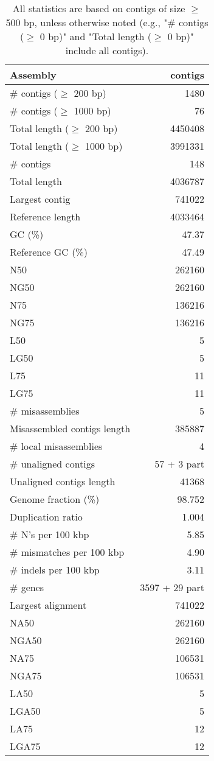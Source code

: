 \documentclass[12pt,a4paper]{article}
\begin{document}
\begin{table}[ht]
\begin{center}
\caption{All statistics are based on contigs of size $\geq$ 500 bp, unless otherwise noted (e.g., "\# contigs ($\geq$ 0 bp)" and "Total length ($\geq$ 0 bp)" include all contigs).}
\begin{tabular}{|l*{1}{|r}|}
\hline
Assembly & contigs \\ \hline
\# contigs ($\geq$ 200 bp) & 1480 \\ \hline
\# contigs ($\geq$ 1000 bp) & 76 \\ \hline
Total length ($\geq$ 200 bp) & 4450408 \\ \hline
Total length ($\geq$ 1000 bp) & 3991331 \\ \hline
\# contigs & 148 \\ \hline
Total length & 4036787 \\ \hline
Largest contig & 741022 \\ \hline
Reference length & 4033464 \\ \hline
GC (\%) & 47.37 \\ \hline
Reference GC (\%) & 47.49 \\ \hline
N50 & 262160 \\ \hline
NG50 & 262160 \\ \hline
N75 & 136216 \\ \hline
NG75 & 136216 \\ \hline
L50 & 5 \\ \hline
LG50 & 5 \\ \hline
L75 & 11 \\ \hline
LG75 & 11 \\ \hline
\# misassemblies & 5 \\ \hline
Misassembled contigs length & 385887 \\ \hline
\# local misassemblies & 4 \\ \hline
\# unaligned contigs & 57 + 3 part \\ \hline
Unaligned contigs length & 41368 \\ \hline
Genome fraction (\%) & 98.752 \\ \hline
Duplication ratio & 1.004 \\ \hline
\# N's per 100 kbp & 5.85 \\ \hline
\# mismatches per 100 kbp & 4.90 \\ \hline
\# indels per 100 kbp & 3.11 \\ \hline
\# genes & 3597 + 29 part \\ \hline
Largest alignment & 741022 \\ \hline
NA50 & 262160 \\ \hline
NGA50 & 262160 \\ \hline
NA75 & 106531 \\ \hline
NGA75 & 106531 \\ \hline
LA50 & 5 \\ \hline
LGA50 & 5 \\ \hline
LA75 & 12 \\ \hline
LGA75 & 12 \\ \hline
\end{tabular}
\end{center}
\end{table}
\end{document}
